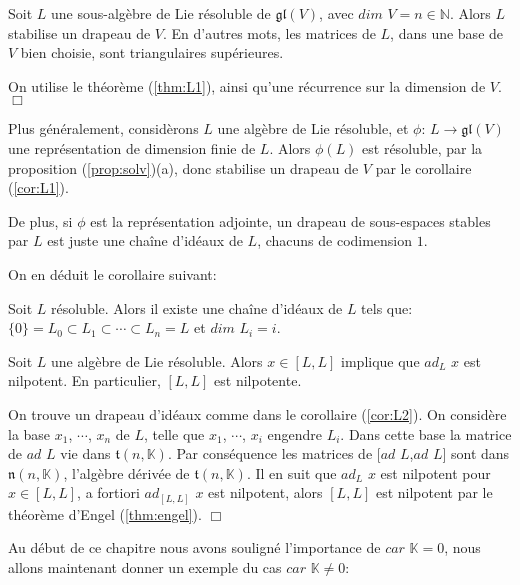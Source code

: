\documentclass[a4paper,openany,12pt]{report}
\newcommand{\KK}{\mathbb{K}}
\newcommand{\NN}{\mathbb{N}}
\newcommand{\gl}{\mathfrak{gl}}
\newcommand{\ttt}{\mathfrak{t}}
\newcommand{\nn}{\mathfrak{n}}
\theoremstyle{break}
{\theorembodyfont{\upshape}
\newtheorem*{rmq}{Remarque :}
\newtheorem*{prv}{Preuve :}
\newtheorem*{ex}{Exemples :}
\newtheorem*{exe}{Exemple : }
\newtheorem*{nota}{Notation :}
\newtheorem*{dem}{D\'emonstration :}}
\begin{document}
\begin{cor}\label{cor:L1}
\quad Soit $L$ une sous-algèbre de Lie résoluble de $\gl(V)$, avec $dim$ $V = n \in \NN$. Alors $L$ stabilise un drapeau de $V$.
En d'autres mots, les matrices de $L$, dans une base de $V$ bien choisie, sont triangulaires supérieures.
\end{cor}

\begin{prv}
\quad On utilise le théorème (\ref{thm:L1}), ainsi qu'une récurrence sur la dimension de $V$. $\Box$
\end{prv}

Plus généralement, considèrons $L$ une algèbre de Lie résoluble, et $\phi$: $L \to \gl(V)$ une représentation de dimension finie de $L$. Alors $\phi(L)$ est résoluble, par la proposition (\ref{prop:solv})(a), donc stabilise un drapeau de $V$ par le corollaire (\ref{cor:L1}).

De plus, si $\phi$ est la représentation adjointe, un drapeau de sous-espaces stables par $L$ est juste une chaîne d'idéaux de $L$, chacuns de codimension $1$.

On en déduit le corollaire suivant: 

\begin{cor}\label{cor:L2}
\quad Soit $L$ résoluble. Alors il existe une chaîne d'idéaux de $L$ tels que:
\center $\{0\}=L_{0} \subset L_{1} \subset \cdots \subset L_{n} = L$ et $dim$ $L_{i}=i$.
\end{cor}

\begin{cor}\label{cor:L3}
\quad Soit $L$ une algèbre de Lie résoluble. Alors $x \in [L,L]$ implique que $ad_{L}$ $x$ est nilpotent.
En particulier, $[L,L]$ est nilpotente.
\end{cor}

\begin{prv}
\quad On trouve un drapeau d'idéaux comme dans le corollaire (\ref{cor:L2}). On considère la base $x_{1}$, $\cdots$, $x_{n}$ de $L$, telle que $x_{1}$, $\cdots$, $x_{i}$ engendre $L_{i}$. Dans cette base la matrice de $ad$ $L$ vie dans $\ttt(n,\KK)$. Par conséquence les matrices de $[ad$ $L$,$ad$ $L]$ sont dans $\nn(n,\KK)$, l'algèbre dérivée de $\ttt(n,\KK)$. Il en suit que $ad_{L}$ $x$ est nilpotent pour $x \in [L,L]$, a fortiori $ad_{[L,L]}$ $x$ est nilpotent, alors $[L,L]$ est nilpotent par le théorème d'Engel (\ref{thm:engel}). $\Box$
\end{prv}

Au début de ce chapitre nous avons souligné l'importance de $car$ $\KK = 0$, nous allons maintenant donner un exemple du cas $car$ $\KK \neq 0$:
\end{document}
